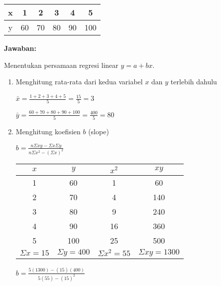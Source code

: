 \documentclass[a4paper]{article}
\begin{document}
\begin{enumerate}[itemsep=1em,leftmargin=*]
\begin{enumerate}
    \begin{tabular}{|c|c|c|c|c|c|}
      \hline
      x & 1 & 2 & 3 & 4 & 5 \\
      \hline
      y & 60 & 70 & 80 & 90 & 100 \\
      \hline
    \end{tabular}
    
    \textbf{Jawaban:}

    Menentukan persamaan regresi linear $y = a + bx$.
    
    \begin{enumerate}[itemsep=1em,leftmargin=*]
      \item Menghitung rata-rata dari kedua variabel $x$ dan $y$ terlebih dahulu

      \vspace{1em}
      
      \(\bar{x} = \frac{1+2+3+4+5}{5} = \frac{15}{5} = 3\)

      \vspace{1em}

      \(\bar{y} = \frac{60+70+80+90+100}{5} = \frac{400}{5} = 80\)

      \item Menghitung koefisien $b$ (slope)
      
      \vspace{1em}

      \(b = \frac{n\Sigma xy - \Sigma x \Sigma y}{n\Sigma x^2 - (\Sigma x)^2}\)

      \begin{tabular}{|c|c|c|c|}
        \hline
        $x$ & $y$ & $x^2$ & $xy$ \\
        \hline
        1 & 60 & 1 & 60 \\
        2 & 70 & 4 & 140 \\
        3 & 80 & 9 & 240 \\
        4 & 90 & 16 & 360 \\
        5 & 100 & 25 & 500 \\
        \hline
        \(\Sigma x = 15\) & \(\Sigma y = 400\) & \(\Sigma x^2 = 55\) & \(\Sigma xy = 1300\) \\
        \hline
      \end{tabular}

      \vspace{1em}

      \(b = \frac{5(1300) - (15)(400)}{5(55) - (15)^2}\)
      
      \vspace{1em}


\end{enumerate}
\end{enumerate}
\end{enumerate}
\end{document}
